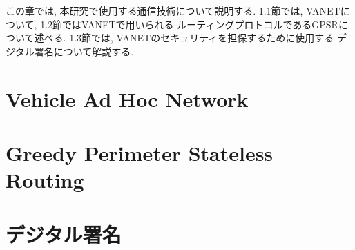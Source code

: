 この章では, 本研究で使用する通信技術について説明する. 
1.1節では, VANETについて, 1.2節ではVANETで用いられる
ルーティングプロトコルであるGPSRについて述べる. 
1.3節では, VANETのセキュリティを担保するために使用する
デジタル署名について解説する.

\section{Vehicle Ad Hoc Network}

\section{Greedy Perimeter Stateless Routing}

\section{デジタル署名}

